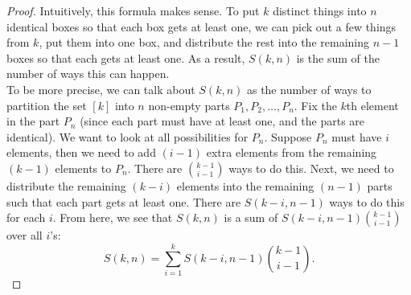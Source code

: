 \documentclass[11pt]{article}
\begin{document}
\begin{enumerate}[(a)]
	\begin{proof}
		Intuitively, this formula makes sense. To put $k$ distinct things into $n$ identical boxes so that each box gets at least one, we can pick out a few things from $k$, put them into one box, and distribute the rest into the remaining $n-1$ boxes so that each gets at least one. As a result, $S(k,n)$ is the sum of the number of ways this can happen. \\
		
		
		To be more precise, we can talk about $S(k,n)$ as the number of ways to partition the set $[k]$ into $n$ non-empty parts $P_1,P_2,\dots,P_n$. Fix the $k$th element in the part $P_n$ (since each part must have at least one, and the parts are identical). We want to look at all possibilities for $P_n$. Suppose $P_n$ must have $i$ elements, then we need to add $(i-1)$ extra elements from the remaining $(k-1)$ elements to $P_n$. There are ${{k-1}\choose{i-1}}$ ways to do this. Next, we need to distribute the remaining $(k-i)$ elements into the remaining $(n-1)$ parts such that each part gets at least one. There are $S(k-i,n-1)$ ways to do this for each $i$. From here, we see that $S(k,n)$ is a sum of $S(k-i,n-1){{k-1}\choose{i-1}}$ over all $i$'s:
		\begin{equation*}
		S(k,n) = \sum^k_{i=1}S(k-i,n-1){{k-1}\choose{i-1}}.
		\end{equation*}
	\end{proof}
\end{enumerate}


\newpage
\end{document}
